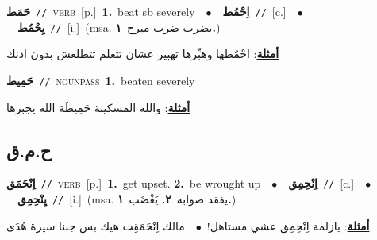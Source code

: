 \documentclass[10pt,a4paper,twoside]{article} %
\begin{document}
\begin{multicols}{2}
{\setlength\topsep{0pt}\textbf{\foreignlanguage{arabic}{حَمَط}}\ {\color{gray}\texttt{//}\color{black}}\ \textsc{verb}\ [p.]\ \textbf{1.}~beat sb severely\ \ $\bullet$\ \ \setlength\topsep{0pt}\textbf{\foreignlanguage{arabic}{اِحْمُط}}\ {\color{gray}\texttt{//}\color{black}}\ [c.]\ \ $\bullet$\ \ \setlength\topsep{0pt}\textbf{\foreignlanguage{arabic}{يِحْمُط}}\ {\color{gray}\texttt{//}\color{black}}\ [i.]\ \color{gray}(msa. \foreignlanguage{arabic}{يضرب ضرب مبرح}~\foreignlanguage{arabic}{\textbf{١.}})\color{black}\  \begin{flushright}\color{gray}\foreignlanguage{arabic}{\textbf{\underline{\foreignlanguage{arabic}{أمثلة}}}: احْمُطها وهبِّرها تهبير عشان تتعلم تتطلعش بدون اذنك}\end{flushright}\color{black}} \vspace{2mm}

{\setlength\topsep{0pt}\textbf{\foreignlanguage{arabic}{حَمِيط}}\ {\color{gray}\texttt{//}\color{black}}\ \textsc{noun\textunderscore pass}\ \textbf{1.}~beaten severely\  \begin{flushright}\color{gray}\foreignlanguage{arabic}{\textbf{\underline{\foreignlanguage{arabic}{أمثلة}}}: والله المسكينة حَمِيطَة الله يجبرها}\end{flushright}\color{black}} \vspace{2mm}

\vspace{-3mm}
\subsection*{\color{blue}\foreignlanguage{arabic}{ح.م.ق}\color{blue}{}} 

{\setlength\topsep{0pt}\textbf{\foreignlanguage{arabic}{اِنْحَمَق}}\ {\color{gray}\texttt{//}\color{black}}\ \textsc{verb}\ [p.]\ \textbf{1.}~get upset.  \textbf{2.}~be wrought up\ \ $\bullet$\ \ \setlength\topsep{0pt}\textbf{\foreignlanguage{arabic}{اِنْحِمِق}}\ {\color{gray}\texttt{//}\color{black}}\ [c.]\ \ $\bullet$\ \ \setlength\topsep{0pt}\textbf{\foreignlanguage{arabic}{يِنْحِمِق}}\ {\color{gray}\texttt{//}\color{black}}\ [i.]\ \color{gray}(msa. \foreignlanguage{arabic}{يفقد صوابه}~\foreignlanguage{arabic}{\textbf{٢.}}  \foreignlanguage{arabic}{يَغْضَب}~\foreignlanguage{arabic}{\textbf{١.}})\color{black}\  \begin{flushright}\color{gray}\foreignlanguage{arabic}{\textbf{\underline{\foreignlanguage{arabic}{أمثلة}}}: يازلمة اِنْحِمِق عشي مستاهل!\ $\bullet$\ \  مالك اِنْحَمَقِت هيك بس جبنا سيرة هُدَى}\end{flushright}\color{black}} \vspace{2mm}


\end{multicols}
\end{document}
